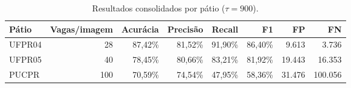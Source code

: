 \begin{table}[htbp]
\centering
\caption{Resultados consolidados por pátio ($\tau=900$).}
\label{tab:patios}
\small
\begin{tabular}{lrrrrrrr}
\toprule
\textbf{Pátio} & \textbf{Vagas/imagem} & \textbf{Acurácia} & \textbf{Precisão} & \textbf{Recall} & \textbf{F1} & \textbf{FP} & \textbf{FN} \\
\midrule
UFPR04 & 28 & 87,42\% & 81,52\% & 91,90\% & 86,40\% & 9.613 & 3.736 \\
UFPR05 & 40 & 78,45\% & 80,66\% & 83,21\% & 81,92\% & 19.443 & 16.353 \\
PUCPR & 100 & 70,59\% & 74,54\% & 47,95\% & 58,36\% & 31.476 & 100.056 \\
\bottomrule
\end{tabular}
\end{table}

